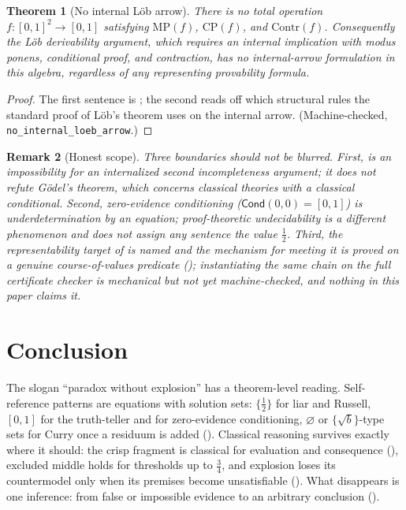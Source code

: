 \documentclass[11pt,a4paper]{article}
\newtheorem{theorem}{Theorem}[section]
\newtheorem{remark}[theorem]{Remark}
\newcommand{\Cond}{\mathsf{Cond}}
\begin{document}
\begin{theorem}[No internal L\"ob arrow]
\label{thm:no-loeb}
There is no total operation $f : [0,1]^2 \to [0,1]$ satisfying
$\mathrm{MP}(f)$, $\mathrm{CP}(f)$, and $\mathrm{Contr}(f)$.
Consequently the L\"ob derivability argument, which requires an
internal implication with modus ponens, conditional proof, and
contraction, has no internal-arrow formulation in this algebra,
regardless of any representing provability formula.
\end{theorem}
\begin{proof}
The first sentence is ; the second reads off
which structural rules the standard proof of L\"ob's theorem uses on
the internal arrow.
(Machine-checked, \texttt{no\_internal\_loeb\_arrow}.)
\end{proof}

\begin{remark}[Honest scope]
\label{rem:scope}
Three boundaries should not be blurred.
First,  is an impossibility for an
\emph{internalized} second incompleteness argument; it does not refute
G\"odel's theorem, which concerns classical theories with a classical
conditional.
Second, zero-evidence conditioning ($\Cond(0,0) = [0,1]$) is
underdetermination by an equation; proof-theoretic undecidability is a
different phenomenon and does not assign any sentence the value
$\tfrac12$.
Third, the representability target of  is named
and the mechanism for meeting it is proved on a genuine
course-of-values predicate (); instantiating the
same chain on the full certificate checker is mechanical but not yet
machine-checked, and nothing in this paper claims it.
\end{remark}

\section{Conclusion}
\label{sec:conclusion}

The slogan ``paradox without explosion'' has a theorem-level reading.
Self-reference patterns are equations with solution sets:
$\{\tfrac12\}$ for liar and Russell, $[0,1]$ for the truth-teller and
for zero-evidence conditioning, $\varnothing$ or $\{\sqrt b\}$-type
sets for Curry once a residuum is added
().
Classical reasoning survives exactly where it should: the crisp
fragment is classical for evaluation and consequence
(), excluded middle holds for
thresholds up to $\tfrac34$, and explosion loses its countermodel only
when its premises become unsatisfiable
().
What disappears is one inference: from false or impossible evidence to
an arbitrary conclusion
().
\end{document}
